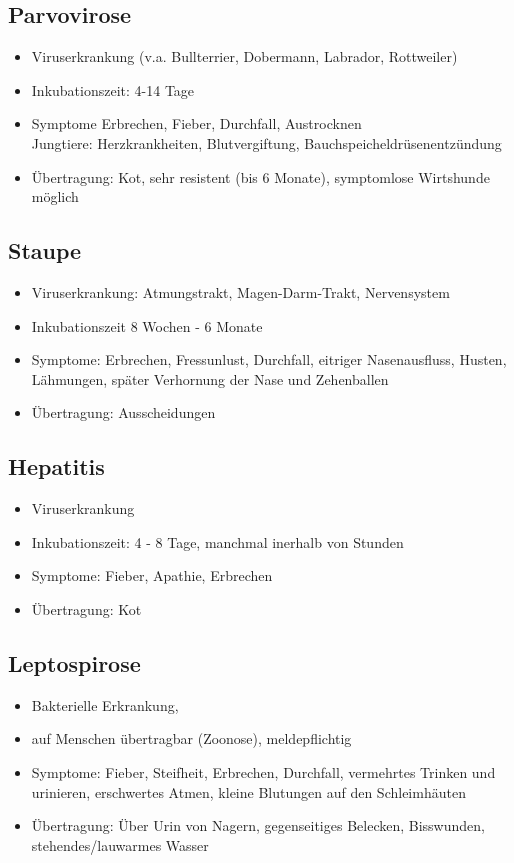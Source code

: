     \subsection{Parvovirose}
    \begin{itemize}
        \item Viruserkrankung (v.a. Bullterrier, Dobermann, Labrador, Rottweiler)
        \item Inkubationszeit: 4-14 Tage
        \item Symptome Erbrechen, Fieber, Durchfall, Austrocknen \\
              Jungtiere: Herzkrankheiten, Blutvergiftung, Bauchspeicheldrüsenentzündung
        \item Übertragung: Kot, sehr resistent (bis 6 Monate), symptomlose Wirtshunde möglich
    \end{itemize}

    \subsection{Staupe}
    \begin{itemize}
        \item Viruserkrankung: Atmungstrakt, Magen-Darm-Trakt, Nervensystem
        \item Inkubationszeit 8 Wochen - 6 Monate
        \item Symptome: Erbrechen, Fressunlust, Durchfall, eitriger Nasenausfluss, Husten, Lähmungen, später Verhornung der Nase und Zehenballen
        \item Übertragung: Ausscheidungen
    \end{itemize}

    \subsection{Hepatitis}
    \begin{itemize}
        \item Viruserkrankung
        \item Inkubationszeit: 4 - 8 Tage, manchmal inerhalb von Stunden
        \item Symptome: Fieber, Apathie, Erbrechen
        \item Übertragung: Kot
    \end{itemize}

    \subsection{Leptospirose}
    \begin{itemize}
        \item Bakterielle Erkrankung,
        \item auf Menschen übertragbar (Zoonose), meldepflichtig
        \item Symptome: Fieber, Steifheit, Erbrechen, Durchfall, vermehrtes Trinken und urinieren, erschwertes Atmen, kleine Blutungen auf den Schleimhäuten
        \item Übertragung: Über Urin von Nagern, gegenseitiges Belecken, Bisswunden, stehendes/lauwarmes Wasser
    \end{itemize}

